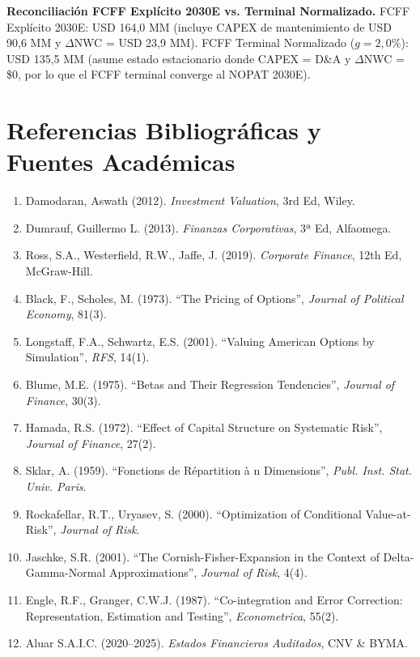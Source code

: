 \documentclass[10pt,a4paper]{article}
\begin{document}
{\small \textbf{Reconciliaci\'on FCFF Expl\'icito 2030E vs. Terminal Normalizado.} FCFF Expl\'icito 2030E: USD 164,0 MM (incluye CAPEX de mantenimiento de USD 90,6 MM y $\Delta$NWC = USD 23,9 MM). FCFF Terminal Normalizado ($g = 2,0\%$): USD 135,5 MM (asume estado estacionario donde CAPEX = D\&A y $\Delta$NWC = \$0, por lo que el FCFF terminal converge al NOPAT 2030E).}



\section*{Referencias Bibliográficas y Fuentes Académicas}
\begin{enumerate}
    \item Damodaran, Aswath (2012). \textit{Investment Valuation}, 3rd Ed, Wiley.
    \item Dumrauf, Guillermo L. (2013). \textit{Finanzas Corporativas}, 3ª Ed, Alfaomega.
    \item Ross, S.A., Westerfield, R.W., Jaffe, J. (2019). \textit{Corporate Finance}, 12th Ed, McGraw-Hill.
    \item Black, F., Scholes, M. (1973). ``The Pricing of Options'', \textit{Journal of Political Economy}, 81(3).
    \item Longstaff, F.A., Schwartz, E.S. (2001). ``Valuing American Options by Simulation'', \textit{RFS}, 14(1).
    \item Blume, M.E. (1975). ``Betas and Their Regression Tendencies'', \textit{Journal of Finance}, 30(3).
    \item Hamada, R.S. (1972). ``Effect of Capital Structure on Systematic Risk'', \textit{Journal of Finance}, 27(2).
    \item Sklar, A. (1959). ``Fonctions de Répartition à n Dimensions'', \textit{Publ. Inst. Stat. Univ. Paris}.
    \item Rockafellar, R.T., Uryasev, S. (2000). ``Optimization of Conditional Value-at-Risk'', \textit{Journal of Risk}.
    \item Jaschke, S.R. (2001). ``The Cornish-Fisher-Expansion in the Context of Delta-Gamma-Normal Approximations'', \textit{Journal of Risk}, 4(4).
    \item Engle, R.F., Granger, C.W.J. (1987). ``Co-integration and Error Correction: Representation, Estimation and Testing'', \textit{Econometrica}, 55(2).
    \item Aluar S.A.I.C. (2020–2025). \textit{Estados Financieros Auditados}, CNV \& BYMA.
\end{enumerate}
\end{document}
